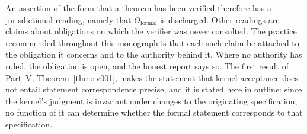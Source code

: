 An assertion of the form that a theorem has been verified therefore has a jurisdictional reading, namely that $O_{\mathrm{formal}}$ is discharged. Other readings are claims about obligations on which the verifier was never consulted. The practice recommended throughout this monograph is that each such claim be attached to the obligation it concerns and to the authority behind it. Where no authority has ruled, the obligation is open, and the honest report says so. The first result of Part~V, Theorem~\ref{thm:rv001}, makes the statement that kernel acceptance does not entail statement correspondence precise, and it is stated here in outline: since the kernel's judgment is invariant under changes to the originating specification, no function of it can determine whether the formal statement corresponds to that specification.
